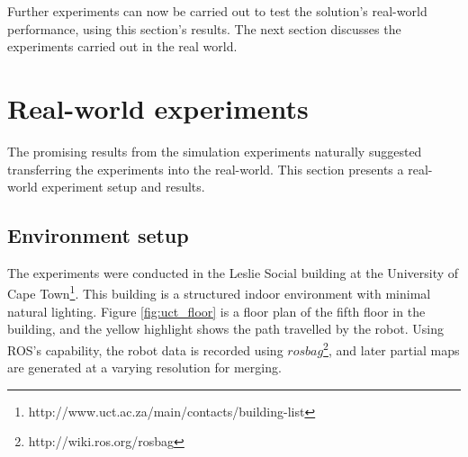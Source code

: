 Further experiments can now be carried out to test the solution's real-world performance, using this section's results. The next section discusses the experiments carried out in the real world.




\section{Real-world experiments}
\label{subsec:ch4.section1.subsec2}

The promising results from the simulation experiments naturally suggested transferring the experiments into the real-world. This section presents a real-world experiment setup and results.

\subsection{Environment setup}

The experiments were conducted in the Leslie Social building at the University of Cape Town\footnote{http://www.uct.ac.za/main/contacts/building-list}. This building is a structured indoor environment with minimal natural lighting. Figure \ref{fig:uct_floor} is a floor plan of the fifth floor in the building, and the yellow highlight shows the path travelled by the robot. Using ROS's capability, the robot data is recorded using \(rosbag\)\footnote{http://wiki.ros.org/rosbag}, and later partial maps are generated at a varying resolution for merging.

